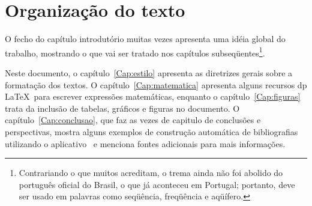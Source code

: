 \section{Organização do texto}

O fecho do capítulo introdutório muitas vezes apresenta uma idéia
global do trabalho, mostrando o que vai ser tratado nos capítulos
subseqüentes\footnote{Contrariando o que muitos acreditam, o trema
ainda não foi abolido do português oficial do Brasil, o que já
aconteceu em Portugal; portanto, deve ser usado em palavras como
seqüência, freqüência e aqüífero.}.

Neste documento, o capítulo~\ref{Cap:estilo} apresenta as diretrizes
gerais sobre a formatação dos textos. O capítulo~\ref{Cap:matematica}
apresenta alguns recursos dp \LaTeX\ para escrever expressões
matemáticas, enquanto o capítulo~\ref{Cap:figuras} trata da inclusão
de tabelas, gráficos e figuras no documento. O
capítulo~\ref{Cap:conclusao}, que faz as vezes de capitulo de
conclusões e perspectivas, mostra alguns exemplos de construção
automática de bibliografias utilizando o aplicativo \BibTeX\ e
menciona fontes adicionais para mais informações.


